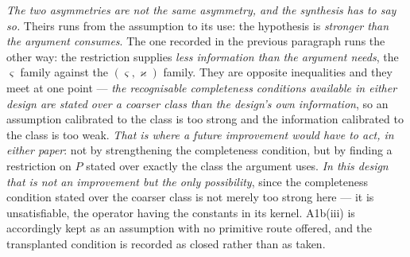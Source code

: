 \begin{remark}
\emph{The two asymmetries are not the same asymmetry, and the synthesis has to say so.} Theirs runs from
the assumption to its use: the hypothesis is \emph{stronger than the argument consumes}. The one recorded
in the previous paragraph runs the other way: the restriction supplies \emph{less information than the
argument needs}, the $\varsigma$ family against the $(\varsigma,\varkappa)$ family. They are opposite
inequalities and they meet at one point --- \emph{the recognisable completeness conditions available in
either design are stated over a coarser class than the design's own information}, so an assumption
calibrated to the class is too strong and the information calibrated to the class is too weak. \emph{That
is where a future improvement would have to act, in either paper}: not by strengthening the completeness
condition, but by finding a restriction on $P$ stated over exactly the class the argument uses.
\emph{In this design that is not an improvement but the only possibility}, since the completeness
condition stated over the coarser class is not merely too strong here --- it is unsatisfiable, the
operator having the constants in its kernel. A1b(iii) is accordingly kept as an assumption with no
primitive route offered, and the transplanted condition is recorded as closed rather than as taken.
\end{remark}


